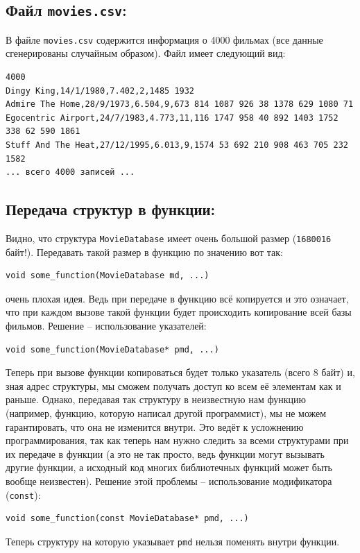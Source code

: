 \documentclass{article}
\begin{document}
\subsection*{Файл \texttt{movies.csv}:}
В файле \texttt{movies.csv} содержится информация о 4000 фильмах (все данные сгенерированы случайным образом). Файл имеет следующий вид:
\begin{verbatim}
4000
Dingy King,14/1/1980,7.402,2,1485 1932
Admire The Home,28/9/1973,6.504,9,673 814 1087 926 38 1378 629 1080 71
Egocentric Airport,24/7/1983,4.773,11,116 1747 958 40 892 1403 1752 338 62 590 1861
Stuff And The Heat,27/12/1995,6.013,9,1574 53 692 210 908 463 705 232 1582
... всего 4000 записей ...
\end{verbatim}

\newpage
\subsection*{Передача структур в функции:}
Видно, что структура \texttt{MovieDatabase} имеет очень большой размер (\texttt{1680016} байт!). Передавать такой размер в функцию по значению вот так:
\begin{lstlisting}
void some_function(MovieDatabase md, ...)
\end{lstlisting} 
очень плохая идея. Ведь при передаче в функцию всё копируется и это означает, что при каждом вызове такой функции будет происходить копирование всей базы фильмов. Решение -- использование указателей:
\begin{lstlisting}
void some_function(MovieDatabase* pmd, ...)
\end{lstlisting}
Теперь при вызове функции копироваться будет только указатель (всего 8 байт) и, зная адрес структуры, мы сможем получать доступ ко всем её элементам как и раньше. Однако, передавая так структуру в неизвестную нам функцию (например, функцию, которую написал другой программист), мы не можем гарантировать, что она не изменится внутри. Это ведёт к усложнению программирования, так как теперь нам нужно следить за всеми структурами при их передаче в функции (а это не так просто, ведь функции могут вызывать другие функции, а исходный код многих библиотечных функций может быть вообще неизвестен). Решение этой проблемы -- использование модификатора (\texttt{const}):
\begin{lstlisting}
void some_function(const MovieDatabase* pmd, ...)
\end{lstlisting}
Теперь структуру на которую указывает \texttt{pmd} нельзя поменять внутри функции.
\end{document}
